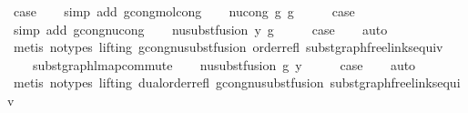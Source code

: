\begin{isabellebody}
\ {\isacharquery}{\kern0pt}case\isanewline
\ \ \isamarkupfalse%
\ {\isacharparenleft}{\kern0pt}simp\ add{\isacharcolon}{\kern0pt}\ gcong{\isachardot}{\kern0pt}mol{\isacharunderscore}{\kern0pt}cong{\isacharparenright}{\kern0pt}\isanewline
{}\isamarkupfalse%
\isanewline
\ \ \isamarkupfalse%
\ {\isacharparenleft}{\kern0pt}nu{\isacharunderscore}{\kern0pt}cong\ g\ g{\isacharprime}{\kern0pt}{\isacharparenright}{\kern0pt}\isanewline
\ \ \isamarkupfalse%
\ \isamarkupfalse%
\ {\isacharquery}{\kern0pt}case\isanewline
\ \ \isamarkupfalse%
\ {\isacharparenleft}{\kern0pt}simp\ add{\isacharcolon}{\kern0pt}\ gcong{\isachardot}{\kern0pt}nu{\isacharunderscore}{\kern0pt}cong{\isacharparenright}{\kern0pt}\isanewline
{}\isamarkupfalse%
\isanewline
\ \ \isamarkupfalse%
\ {\isacharparenleft}{\kern0pt}nu{\isacharunderscore}{\kern0pt}subst{\isacharunderscore}{\kern0pt}fusion{}\ y\ g{\isacharparenright}{\kern0pt}\isanewline
\ \ \isamarkupfalse%
\ \isamarkupfalse%
\ {\isacharquery}{\kern0pt}case\isanewline
\ \ \isamarkupfalse%
\ auto\isanewline
\ \ \isamarkupfalse%
\ {\isacharparenleft}{\kern0pt}metis\ {\isacharparenleft}{\kern0pt}no{\isacharunderscore}{\kern0pt}types{\isacharcomma}{\kern0pt}\ lifting{\isacharparenright}{\kern0pt}\ gcong{\isachardot}{\kern0pt}nu{\isacharunderscore}{\kern0pt}subst{\isacharunderscore}{\kern0pt}fusion{}\ order{\isacharunderscore}{\kern0pt}refl\ subst{\isacharunderscore}{\kern0pt}graph{\isacharunderscore}{\kern0pt}freelinks{\isacharunderscore}{\kern0pt}equiv\isanewline
\ \ \ \ subst{\isacharunderscore}{\kern0pt}graph{\isacharunderscore}{\kern0pt}lmap{\isacharunderscore}{\kern0pt}commute{\isacharparenright}{\kern0pt}\isanewline
{}\isamarkupfalse%
\isanewline
\ \ \isamarkupfalse%
\ {\isacharparenleft}{\kern0pt}nu{\isacharunderscore}{\kern0pt}subst{\isacharunderscore}{\kern0pt}fusion{}\ g\ y{\isacharparenright}{\kern0pt}\isanewline
\ \ \isamarkupfalse%
\ \isamarkupfalse%
\ {\isacharquery}{\kern0pt}case\isanewline
\ \ \isamarkupfalse%
\ auto\isanewline
\ \ \isamarkupfalse%
\ {\isacharparenleft}{\kern0pt}metis\ {\isacharparenleft}{\kern0pt}no{\isacharunderscore}{\kern0pt}types{\isacharcomma}{\kern0pt}\ lifting{\isacharparenright}{\kern0pt}\ dual{\isacharunderscore}{\kern0pt}order{\isachardot}{\kern0pt}refl\ gcong{\isachardot}{\kern0pt}nu{\isacharunderscore}{\kern0pt}subst{\isacharunderscore}{\kern0pt}fusion{}\ subst{\isacharunderscore}{\kern0pt}graph{\isacharunderscore}{\kern0pt}freelinks{\isacharunderscore}{\kern0pt}equiv\isanewline

\end{isabellebody}
